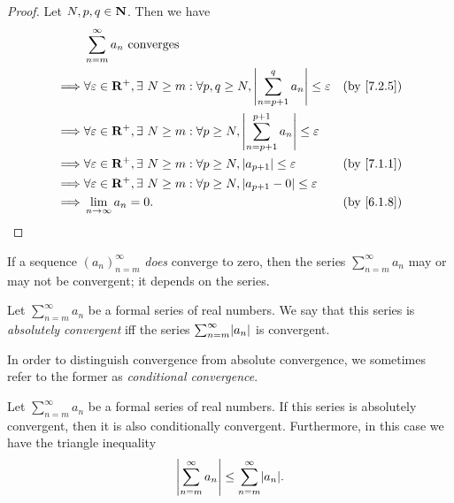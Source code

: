 \begin{proof}
  Let \(N, p, q \in \mathbf{N}\).
  Then we have
  \begin{align*}
             & \sum_{n = m}^\infty a_n \text{ converges}                                                                                                          \\
    \implies & \forall \varepsilon \in \R^+, \exists\ N \geq m : \forall p, q \geq N, \abs{\sum_{n = p + 1}^q a_n} \leq \varepsilon    & \text{(by \cref{7.2.5})} \\
    \implies & \forall \varepsilon \in \R^+, \exists\ N \geq m : \forall p \geq N, \abs{\sum_{n = p + 1}^{p + 1} a_n} \leq \varepsilon                            \\
    \implies & \forall \varepsilon \in \R^+, \exists\ N \geq m : \forall p \geq N, \abs{a_{p + 1}} \leq \varepsilon                    & \text{(by \cref{7.1.1})} \\
    \implies & \forall \varepsilon \in \R^+, \exists\ N \geq m : \forall p \geq N, \abs{a_{p + 1} - 0} \leq \varepsilon                                           \\
    \implies & \lim_{n \to \infty} a_n = 0.                                                                                            & \text{(by \cref{6.1.8})}
  \end{align*}
\end{proof}

\begin{note}
  If a sequence \((a_n)_{n = m}^\infty\) \emph{does} converge to zero, then the series \(\sum_{n = m}^\infty a_n\) may or may not be convergent;
  it depends on the series.
\end{note}

\setcounter{theorem}{7}
\begin{definition}\label{7.2.8}
  Let \(\sum_{n = m}^\infty a_n\) be a formal series of real numbers.
  We say that this series is \emph{absolutely convergent} iff the series \(\sum_{n = m}^\infty \abs{a_n}\) is convergent.
\end{definition}

\begin{note}
  In order to distinguish convergence from absolute convergence, we sometimes refer to the former as \emph{conditional convergence}.
\end{note}

\begin{proposition}\label{7.2.9}
  Let \(\sum_{n = m}^\infty a_n\) be a formal series of real numbers.
  If this series is absolutely convergent, then it is also conditionally convergent.
  Furthermore, in this case we have the triangle inequality
  \[
    \abs{\sum_{n = m}^\infty a_n} \leq \sum_{n = m}^\infty \abs{a_n}.
  \]
\end{proposition}

